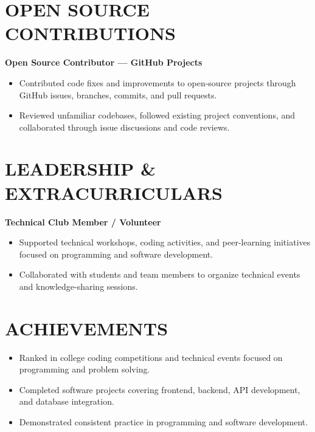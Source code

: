 \documentclass[10pt,a4paper]{article}
\begin{document}

\section*{OPEN SOURCE CONTRIBUTIONS}

\textbf{Open Source Contributor --- GitHub Projects}

\begin{itemize}

    \item Contributed code fixes and improvements to open-source projects
    through GitHub issues, branches, commits, and pull requests.

    \item Reviewed unfamiliar codebases, followed existing project conventions,
    and collaborated through issue discussions and code reviews.

\end{itemize}



\section*{LEADERSHIP \& EXTRACURRICULARS}

\textbf{Technical Club Member / Volunteer}

\begin{itemize}

    \item Supported technical workshops, coding activities, and peer-learning
    initiatives focused on programming and software development.

    \item Collaborated with students and team members to organize technical
    events and knowledge-sharing sessions.

\end{itemize}



\section*{ACHIEVEMENTS}

\begin{itemize}

    \item Ranked in college coding competitions and technical events focused
    on programming and problem solving.

    \item Completed software projects covering frontend, backend, API
    development, and database integration.

    \item Demonstrated consistent practice in programming and software
    development.

\end{itemize}
\end{document}

